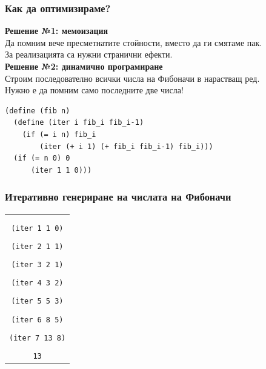 \documentclass{beamer}
\begin{document}
\begin{frame}[fragile]
  \frametitle{Как да оптимизираме?}

  \textbf{Решение №1: мемоизация}\\
  Да помним вече пресметнатите стойности, вместо да ги смятаме пак.\\
  \pause
  \alert{За реализацията са нужни странични ефекти.}\\[1em]
  \pause
  \textbf{Решение №2: динамично програмиране}\\
  Строим последователно всички числа на Фибоначи в нарастващ ред.\\
  \pause
  \alert{Нужно е да помним само последните две числа!}\\
  \pause
\begin{lstlisting}
(define (fib n)
  (define (iter i fib_i fib_i-1)
    (if (= i n) fib_i
        (iter (+ i 1) (+ fib_i fib_i-1) fib_i)))
  (if (= n 0) 0
      (iter 1 1 0)))
\end{lstlisting}
\end{frame}

\begin{frame}
  \frametitle{Итеративно генериране на числата на Фибоначи}

  \small
  \begin{center}
    \begin{tabular}{c}
      \nxt{\tt{(fib 7)}\\
      \nxt{\bda\\
      \tt{(iter 1 1 0)}\\
      \nxt{\bda\\
      \tt{(iter 2 1 1)}\\
      \nxt{\bda\\
      \tt{(iter 3 2 1)}\\
      \nxt{\bda\\
      \tt{(iter 4 3 2)}\\
      \nxt{\bda\\
      \tt{(iter 5 5 3)}\\
      \nxt{\bda\\
      \tt{(iter 6 8 5)}\\
      \nxt{\bda\\
      \tt{(iter 7 13 8)}\\
      \nxt{\bda\\
      \tt{13}}}}}}}}}}
    \end{tabular}
  \end{center}
\end{frame}
\end{document}
